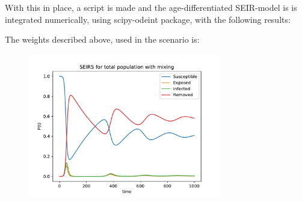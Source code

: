 With this in place, a script is made and the age-differentiated SEIR-model is is integrated numerically, using scipy-odeint package, with the following results:

\newpage

The weights described above, used in the scenario is:
\begin{table}[H]
\centering

\end{table}

\begin{figure}[H]
\centering
\includegraphics[width = 0.75\textwidth]{../fig/SEIRS_total_population_mix_n.pdf}
\caption{
\protect 
\label{fig:total_pop_mix_n}}
\end{figure}


